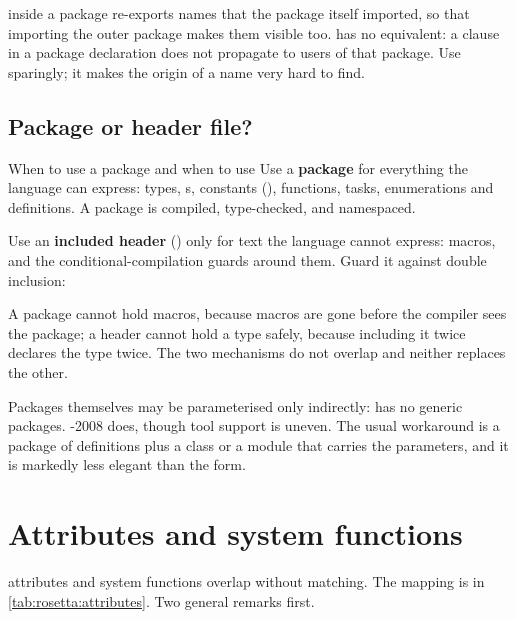  inside a package re-exports names that the package
itself imported, so that importing the outer package makes them visible too.
\VHDL{} has no equivalent: a  clause in a package declaration does
not propagate to users of that package. Use  sparingly; it makes
the origin of a name very hard to find.

\subsection{Package or header file?}

\begin{tipbox}{When to use a package and when to use }
Use a \textbf{package} for everything the language can express: types,
s, constants (), functions, tasks, enumerations
and  definitions. A package is compiled, type-checked, and
namespaced.

Use an \textbf{included header} () only for text the language cannot
express: macros, and the conditional-compilation guards around them. Guard it
against double inclusion:
A package cannot hold macros, because macros are gone before the compiler sees
the package; a header cannot hold a type safely, because including it twice
declares the type twice. The two mechanisms do not overlap and neither replaces
the other.
\end{tipbox}

Packages themselves may be parameterised only indirectly: \SV{} has no generic
packages. \VHDL{}-2008 does, though tool support is uneven. The usual \SV{}
workaround is a package of  definitions plus a class or a
module that carries the parameters, and it is markedly less elegant than the
\VHDL{} form.

\section{Attributes and system functions}
\label{sec:rosetta:attributes}

\VHDL{} attributes and \SV{} system functions overlap without matching. The
mapping is in \cref{tab:rosetta:attributes}. Two general remarks first.

